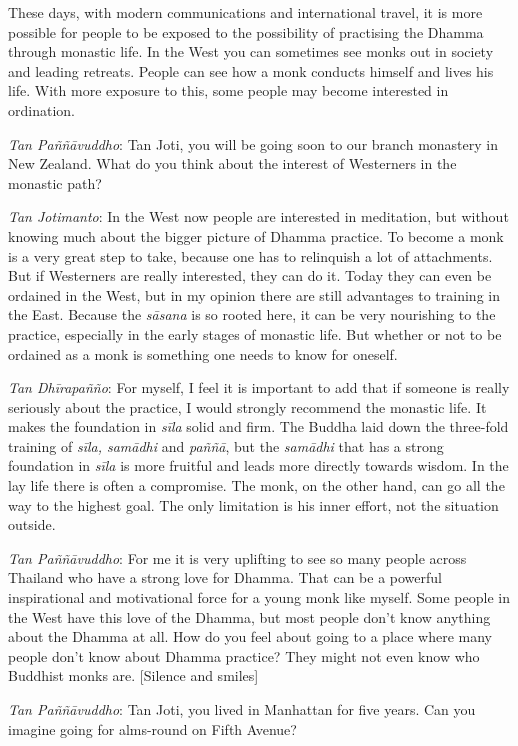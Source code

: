 These days, with modern communications and international travel, it is
more possible for people to be exposed to the possibility of practising
the Dhamma through monastic life. In the West you can sometimes see
monks out in society and leading retreats. People can see how a monk
conducts himself and lives his life. With more exposure to this, some
people may become interested in ordination. 

\emph{Tan Paññāvuddho}: Tan Joti, you will be going soon to our branch
monastery in New Zealand. What do you think about the interest of
Westerners in the monastic path? 

\emph{Tan Jotimanto}: In the West now people are interested in
meditation, but without knowing much about the bigger picture of Dhamma
practice. To become a monk is a very great step to take, because one has
to relinquish a lot of attachments. But if Westerners are really
interested, they can do it. Today they can even be ordained in the West, 
but in my opinion there are still advantages to training in the East. 
Because the \emph{sāsana} is so rooted here, it can be very nourishing
to the practice, especially in the early stages of monastic life. But
whether or not to be ordained as a monk is something one needs to know
for oneself. 

\emph{Tan Dhīrapañño}: For myself, I feel it is important to add that
if someone is really seriously about the practice, I would strongly
recommend the monastic life. It makes the foundation in \emph{sīla}
solid and firm. The Buddha laid down the three-fold training of
\emph{sīla, samādhi} and \emph{paññā}, but the \emph{samādhi} that has a
strong foundation in \emph{sīla} is more fruitful and leads more
directly towards wisdom. In the lay life there is often a compromise. 
The monk, on the other hand, can go all the way to the highest goal. The
only limitation is his inner effort, not the situation outside. 

\emph{Tan Paññāvuddho}: For me it is very uplifting to see so many
people across Thailand who have a strong love for Dhamma. That can be a
powerful inspirational and motivational force for a young monk like
myself. Some people in the West have this love of the Dhamma, but most
people don't know anything about the Dhamma at all. How do you feel
about going to a place where many people don't know about Dhamma
practice? They might not even know who Buddhist monks are. [Silence and smiles]

\emph{Tan Paññāvuddho}: Tan Joti, you lived in Manhattan for five
years. Can you imagine going for alms-round on Fifth Avenue? 

